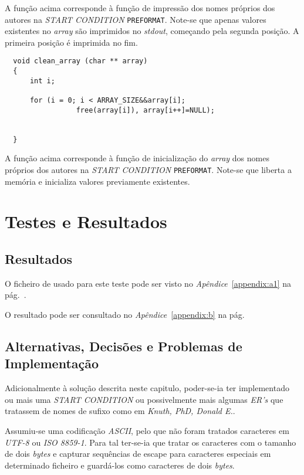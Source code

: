 A função acima corresponde à função de impressão dos nomes próprios dos autores
na \emph{START CONDITION} \texttt{PREFORMAT}. Note-se que apenas valores
existentes no \emph{array} são imprimidos no \emph{stdout}, começando pela
segunda posição. A primeira posição é imprimida no fim.

\begin{verbatim}
  void clean_array (char ** array)
  {
      int i;
    
      for (i = 0; i < ARRAY_SIZE&&array[i]; 
                 free(array[i]), array[i++]=NULL);
      
      
  }

\end{verbatim}

A função acima corresponde à função de inicialização do \emph{array} dos nomes
próprios dos autores na \emph{START CONDITION} \texttt{PREFORMAT}. Note-se que
liberta a memória e inicializa valores previamente existentes.

\newpage
\section{Testes e Resultados}
\label{sec:ts:b1}
\subsection{Resultados}


O ficheiro de usado para este teste pode ser visto no
\emph{Apêndice}~\ref{appendix:a1} na pág.~\pageref{appendix:a1}. 

O resultado pode ser consultado no \emph{Apêndice}~\ref{appendix:b} na
pág.~\pageref{appendix:b}

\subsection{Alternativas, Decisões e Problemas de Implementação}

Adicionalmente à solução descrita neste capitulo, poder-se-ia ter implementado
ou mais uma \emph{START CONDITION} ou possivelmente mais algumas \emph{ER's}
que tratassem de nomes de sufixo como em  \emph{Knuth, PhD, Donald E.}.

Assumiu-se uma codificação \emph{ASCII}, pelo que não foram tratados caracteres
em \emph{UTF-8} ou \emph{ISO 8859-1}. Para tal ter-se-ia que tratar os
caracteres com o tamanho de dois \emph{bytes} e capturar sequências de escape
para caracteres especiais em determinado ficheiro  e guardá-los
como caracteres de dois \emph{bytes}. 






